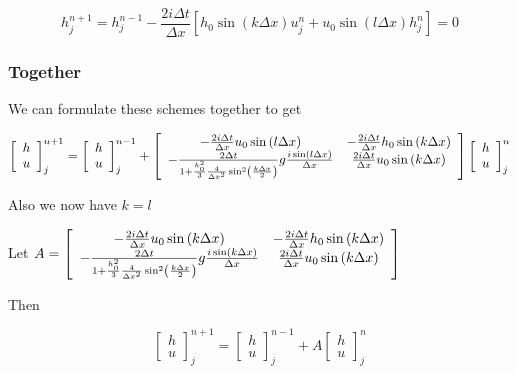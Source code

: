 \documentclass[12pt]{article}
\begin{document}
\[h^{n+1}_j = h^{n-1}_j -\frac{2i\Delta t}{\Delta x} \left[ h_0\sin\left(k \Delta x\right) u^n_j  +  u_0 \sin\left(l \Delta x\right)h^{n}_{j} \right]  = 0\]

\subsubsection{Together}

We can formulate these schemes together to get

\begin{multline}
\left[\begin{array}{c}
h \\
u
\end{array} \right]^{n+1}_j = \left[\begin{array}{c}
h \\
u
\end{array} \right]^{n-1}_j +\left[\begin{array}{c c}
-\frac{2i\Delta t}{\Delta x}u_0 \sin\left(l \Delta x\right) & -\frac{2i\Delta t}{\Delta x}h_0\sin\left(k \Delta x\right) \\
-\frac{2 \Delta t}{1 +\frac{h_0^2}{3}\frac{4}{\Delta x^2}\sin^2\left(\frac{k\Delta x}{2}\right) }g\frac{i \sin\left(l \Delta x\right)}{\Delta x} & \frac{2i\Delta t}{\Delta x}u_0\sin\left(k \Delta x\right)
\end{array} \right]  \left[\begin{array}{c}
h \\
u
\end{array} \right]^{n}_j 
\end{multline}

Also we now have $k = l$

Let $A = \left[\begin{array}{c c}
-\frac{2i\Delta t}{\Delta x}u_0 \sin\left(k \Delta x\right) & -\frac{2i\Delta t}{\Delta x}h_0\sin\left(k \Delta x\right) \\
-\frac{2 \Delta t}{1 +\frac{h_0^2}{3}\frac{4}{\Delta x^2}\sin^2\left(\frac{k\Delta x}{2}\right) }g\frac{i \sin\left(k \Delta x\right)}{\Delta x} & \frac{2i\Delta t}{\Delta x}u_0\sin\left(k \Delta x\right)
\end{array} \right]$

Then

\[
\left[\begin{array}{c}
h \\
u
\end{array} \right]^{n+1}_j = \left[\begin{array}{c}
h \\
u
\end{array} \right]^{n-1}_j +A  \left[\begin{array}{c}
h \\
u
\end{array} \right]^{n}_j 
\]
\end{document}
